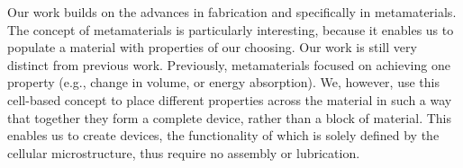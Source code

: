 {Our work builds on the advances in fabrication and specifically in metamaterials. The concept of metamaterials is particularly interesting, because it enables us to populate a material with properties of our choosing. Our work is still very distinct from previous work. Previously, metamaterials focused on achieving one property (e.g., change in volume, or energy absorption). We, however, use this cell-based concept to place different properties across the material in such a way that together they form a complete device, rather than a block of material. This enables us to create devices, the functionality of which is solely defined by the cellular microstructure, thus require no assembly or lubrication. 











    




}
